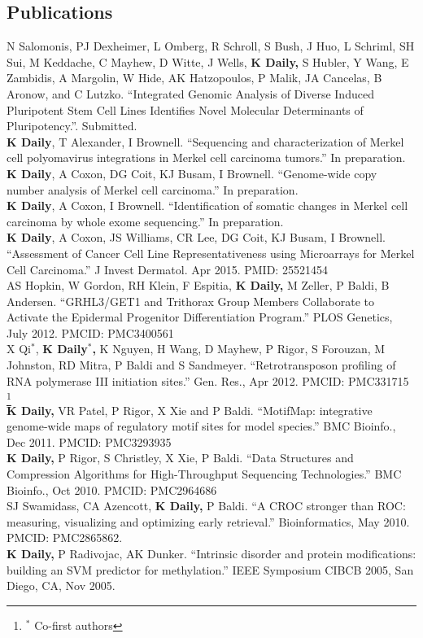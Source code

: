\documentclass[margin,line]{res}
\begin{document}
\begin{resume}
\section{\sc Publications}
N Salomonis, PJ Dexheimer, L Omberg, R Schroll, S Bush, J Huo, L Schriml, SH Sui, M Keddache, C Mayhew, D Witte, J Wells, \textbf{K Daily,} S Hubler, Y Wang, E Zambidis, A Margolin, W Hide, AK Hatzopoulos, P Malik, JA Cancelas, B Aronow, and C Lutzko. ``Integrated Genomic Analysis of Diverse Induced Pluripotent Stem Cell Lines Identifies Novel Molecular Determinants of Pluripotency.''. Submitted. \\
\textbf{K Daily}, T Alexander, I Brownell. ``Sequencing and characterization of Merkel cell polyomavirus integrations in Merkel cell carcinoma tumors.'' In preparation.\\
\textbf{K Daily}, A Coxon, DG Coit, KJ Busam, I Brownell. ``Genome-wide copy number analysis of Merkel cell carcinoma.'' In preparation.\\
\textbf{K Daily}, A Coxon, I Brownell. ``Identification of somatic changes in Merkel cell carcinoma by whole exome sequencing.'' In preparation.\\
\textbf{K Daily}, A Coxon, JS Williams, CR Lee, DG Coit, KJ Busam, I Brownell. ``Assessment of Cancer Cell Line Representativeness using Microarrays for Merkel Cell Carcinoma.'' J Invest Dermatol. Apr 2015. PMID: 25521454\\
AS Hopkin, W Gordon, RH Klein, F Espitia, \textbf{K Daily,} M Zeller, P Baldi, B Andersen. ``GRHL3/GET1 and Trithorax Group Members Collaborate to Activate the Epidermal Progenitor Differentiation Program.'' PLOS Genetics, July 2012. PMCID: PMC3400561\\
X Qi$^*$, \textbf{K Daily$^*$,} K Nguyen, H Wang, D Mayhew, P Rigor, S Forouzan, M Johnston, RD Mitra, P Baldi and S Sandmeyer. ``Retrotransposon profiling of RNA polymerase III initiation sites.'' Gen. Res., Apr 2012. PMCID: PMC331715 \let\thefootnote\relax\footnote{$^*$ Co-first authors} \\
\textbf{K Daily,} VR Patel, P Rigor, X Xie and P Baldi. ``MotifMap: integrative genome-wide maps of regulatory motif sites for model species.'' BMC Bioinfo., Dec 2011. PMCID: PMC3293935\\
\textbf{K Daily,} P Rigor, S Christley, X Xie, P Baldi. ``Data Structures and Compression Algorithms for High-Throughput Sequencing Technologies.'' BMC Bioinfo., Oct 2010. PMCID: PMC2964686\\
SJ Swamidass, CA Azencott, \textbf{K Daily,} P Baldi. ``A CROC stronger than ROC: measuring, visualizing and optimizing early retrieval.'' Bioinformatics, May 2010. PMCID: PMC2865862.\\
\textbf{K Daily,} P Radivojac, AK Dunker. ``Intrinsic disorder and protein modifications: building an SVM predictor for methylation.'' IEEE Symposium CIBCB 2005, San Diego, CA, Nov 2005.


\end{resume}
\end{document}

